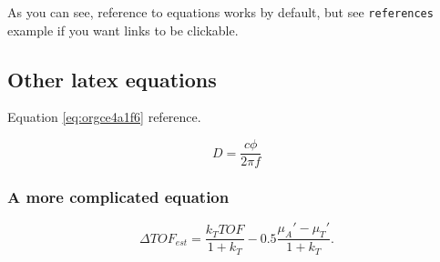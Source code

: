 As you can see, reference to equations works by default, but see \texttt{references}
example if you want links to be clickable.

\subsection{Other latex equations}
\label{sec:orgdc3c491}
Equation \ref{eq:orgce4a1f6} reference.

\begin{equation}
\label{eq:orgce4a1f6}
D = \frac{c\phi}{2\pi f}
\end{equation}

\subsubsection{A more complicated equation}
\label{sec:org88a032f}

\begin{equation}
\Delta TOF_{est} = \frac{k_T TOF}{1+k_T } - 0.5 \frac{\mu_A' - \mu_T'}{1+k_T}.
\end{equation}


